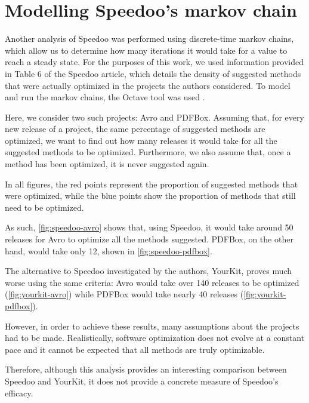 \documentclass[11pt]{article}
\begin{document}
\section*{Modelling Speedoo's markov chain}

Another analysis of Speedoo was performed using discrete-time markov chains, which allow us to determine how many iterations it would take for a value to reach a steady state.
For the purposes of this work, we used information provided in Table 6 of the Speedoo article, which details the density of suggested methods that were actually optimized in the projects the authors considered.
To model and run the markov chains, the Octave tool was used \cite{octave1993}.

Here, we consider two such projects: Avro and PDFBox.
Assuming that, for every new release of a project, the same percentage of suggested methods are optimized, we want to find out how many releases it would take for all the suggested methods to be optimized.
Furthermore, we also assume that, once a method has been optimized, it is never suggested again.

In all figures, the red points represent the proportion of suggested methods that were optimized, while the blue points show the proportion of methods that still need to be optimized.

As such, \autoref{fig:speedoo-avro} shows that, using Speedoo, it would take around 50 releases for Avro to optimize all the methods suggested.
PDFBox, on the other hand, would take only 12, shown in \autoref{fig:speedoo-pdfbox}.

The alternative to Speedoo investigated by the authors, YourKit, proves much worse using the same criteria: Avro would take over 140 releases to be optimized (\autoref{fig:yourkit-avro}) while PDFBox would take nearly 40 releases (\autoref{fig:yourkit-pdfbox}).

However, in order to achieve these results, many assumptions about the projects had to be made.
Realistically, software optimization does not evolve at a constant pace and it cannot be expected that all methods are truly optimizable.

Therefore, although this analysis provides an interesting comparison between Speedoo and YourKit, it does not provide a concrete measure of Speedoo's efficacy.
\end{document}

